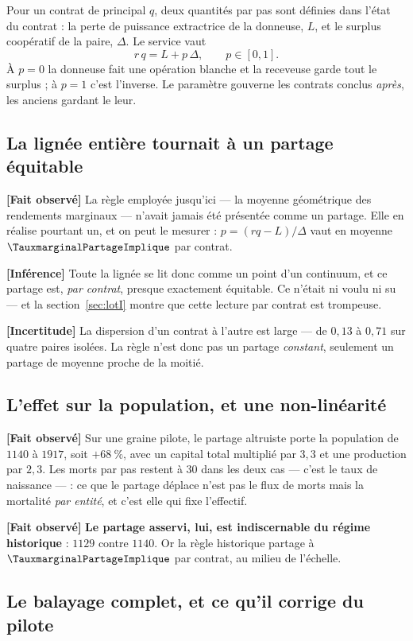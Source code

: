 \documentclass[11pt,a4paper]{article}
\newcommand{\fait}{\textbf{[Fait observé]}}
\newcommand{\inference}{\textbf{[Inférence]}}
\newcommand{\incertitude}{\textbf{[Incertitude]}}
\begin{document}
Pour un contrat de principal $q$, deux quantités par pas sont définies dans
l'état du contrat : la perte de puissance extractrice de la donneuse, $L$, et
le surplus coopératif de la paire, $\Delta$. Le service vaut
\[
r\,q = L + p\,\Delta, \qquad p \in [0,1].
\]
À $p = 0$ la donneuse fait une opération blanche et la receveuse garde tout
le surplus ; à $p = 1$ c'est l'inverse. Le paramètre gouverne les contrats
conclus \emph{après}, les anciens gardant le leur.

\subsection{La lignée entière tournait à un partage équitable}

\fait{} La règle employée jusqu'ici --- la moyenne géométrique des rendements
marginaux --- n'avait jamais été présentée comme un partage. Elle en réalise
pourtant un, et on peut le mesurer : $p = (r q - L)/\Delta$ vaut en moyenne
$\TauxmarginalPartageImplique$ par contrat.

\inference{} Toute la lignée se lit donc comme un point d'un continuum, et
ce partage est, \emph{par contrat}, presque exactement équitable. Ce n'était
ni voulu ni su --- et la section~\ref{sec:lotI} montre que cette lecture par
contrat est trompeuse.

\incertitude{} La dispersion d'un contrat à l'autre est large --- de $0{,}13$
à $0{,}71$ sur quatre paires isolées. La règle n'est donc pas un partage
\emph{constant}, seulement un partage de moyenne proche de la moitié.

\subsection{L'effet sur la population, et une non-linéarité}

\fait{} Sur une graine pilote, le partage altruiste porte la population de
$1140$ à $1917$, soit \textbf{$+68~\%$}, avec un capital total multiplié par
$3{,}3$ et une production par $2{,}3$. Les morts par pas restent à $30$ dans
les deux cas --- c'est le taux de naissance --- : ce que le partage déplace
n'est pas le flux de morts mais la mortalité \emph{par entité}, et c'est elle
qui fixe l'effectif.

\fait{} \textbf{Le partage asservi, lui, est indiscernable du régime
historique} : $1129$ contre $1140$. Or la règle historique partage à
$\TauxmarginalPartageImplique$ par contrat, au milieu de l'échelle.

\subsection{Le balayage complet, et ce qu'il corrige du pilote}
\end{document}

